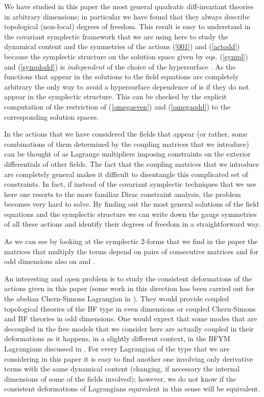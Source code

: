 \documentclass[prd,a4paper,twocolumn,amssymb,amsmath,nofootinbib,showpacs]{revtex4}
\providecommand{\dd}{\textrm{d\!I}}
\begin{document}
We have studied in this paper the most general quadratic
diff-invariant theories in arbitrary dimensions; in particular we
have found that they always describe topological (non-local)
degrees of freedom. This result is easy to understand in the
covariant symplectic framework that we are using here to study the
dynamical content and the symmetries of the actions (\ref{001})
and (\ref{actodd}) because the symplectic structure \myHighlight{$\Omega$}\coordHE{} on
the solution space given by eqs. (\ref{sympl}) and
(\ref{symplodd}) is \emph{independent} of the choice of the
hypersurface \myHighlight{$\Sigma$}\coordHE{}. As the functions that appear in the
solutions to the field equations are completely arbitrary the only
way to avoid a hypersurface dependence of \myHighlight{$\Omega$}\coordHE{} is if they do
not appear in the symplectic structure. This can be checked by the
explicit computation of the restriction of (\ref{omegaeven}) and
(\ref{omegaodd}) to the corresponding solution spaces.

In the actions that we have considered the fields that appear (or
rather, some combinations of them determined by the coupling
matrices that we introduce) can be thought of as Lagrange
multipliers imposing constraints on the exterior differentials of
other fields. The fact that the coupling matrices that we
introduce are completely general makes it difficult to disentangle
this complicated set of constraints. In fact, if instead of the
covariant symplectic techniques that we use here one resorts to
the more familiar Dirac constraint analysis, the problem becomes
very hard to solve. By finding out the most general solutions of
the field equations and the symplectic structure we can write down
the gauge symmetries of all these actions and identify their
degrees of freedom in a straightforward way.

As we can see by looking at the symplectic 2-forms that we find in
the paper the matrices that multiply the \myHighlight{$\dd \mathbf{a} {\wedge
\kern-.55em \wedge}\dd \mathbf{a}$}\coordHE{} terms depend on pairs of
consecutive \myHighlight{$\Theta$}\coordHE{} matrices and for odd dimensions also on \myHighlight{$\Xi$}\coordHE{}
and \coordHE{}.

An interesting and open problem is to study the consistent
deformations of the actions given in this paper (some work in this
direction has been carried out for the abelian Chern-Simons
Lagrangian in \cite{Barnich:1993vg}). They would provide coupled
topological theories of the BF type in even dimensions or coupled
Chern-Simons and BF theories in odd dimensions. One would expect
that some modes that are decoupled in the free models that we
consider here are actually coupled in their deformations as it
happens, in a slightly different context, in the BFYM Lagrangians
discussed in \cite{Cattaneo:1997fg}. For every Lagrangian of the
type that we are considering in this paper it is easy to find
another one involving only derivative terms with the same
dynamical content (changing, if necessary the internal dimensions
of some of the fields involved); however, we do not know if the
consistent deformations of Lagrangians equivalent in this sense
will be equivalent.
\end{document}
